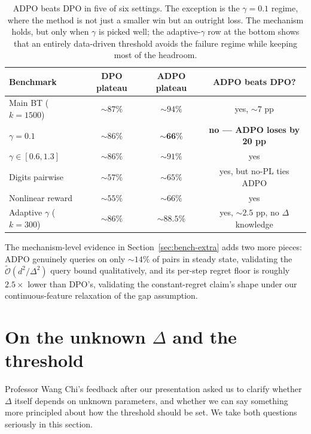 \documentclass[11pt]{article}
\newcommand{\Otilde}{\tilde{\mathcal{O}}}
\begin{document}
\begin{table}[h]
  \centering\small
  \begin{tabular}{lccc}
    \toprule
    \textbf{Benchmark} & \textbf{DPO plateau} & \textbf{ADPO plateau} & \textbf{ADPO beats DPO?}\\
    \midrule
    Main BT ($k = 1500$) & $\sim 87\%$ & $\sim 94\%$ & yes, $\sim 7$ pp \\
    $\gamma = 0.1$       & $\sim 86\%$ & $\mathbf{\sim 66\%}$ & \textbf{no --- ADPO loses by 20 pp} \\
    $\gamma \in [0.6, 1.3]$ & $\sim 86\%$ & $\sim 91\%$ & yes \\
    Digits pairwise      & $\sim 57\%$ & $\sim 65\%$ & yes, but no-PL ties ADPO \\
    Nonlinear reward     & $\sim 55\%$ & $\sim 66\%$ & yes \\
    Adaptive $\gamma$ ($k = 300$) & $\sim 86\%$ & $\sim 88.5\%$ & yes, $\sim 2.5$ pp, no $\Delta$ knowledge \\
    \bottomrule
  \end{tabular}
  \caption{ADPO beats DPO in five of six settings. The exception is the $\gamma = 0.1$ regime, where the method is not just a smaller win but an outright loss. The mechanism holds, but only when $\gamma$ is picked well; the adaptive-$\gamma$ row at the bottom shows that an entirely data-driven threshold avoids the failure regime while keeping most of the headroom.}
  \label{tab:summary}
\end{table}

The mechanism-level evidence in Section~\ref{sec:bench-extra} adds two more pieces: ADPO genuinely queries on only $\sim 14\%$ of pairs in steady state, validating the $\Otilde(d^2/\Delta^2)$ query bound qualitatively, and its per-step regret floor is roughly $2.5\times$ lower than DPO's, validating the constant-regret claim's shape under our continuous-feature relaxation of the gap assumption.

\section{On the unknown $\Delta$ and the threshold}
\label{sec:delta}

Professor Wang Chi's feedback after our presentation asked us to clarify whether $\Delta$ itself depends on unknown parameters, and whether we can say something more principled about how the threshold should be set. We take both questions seriously in this section.
\end{document}
